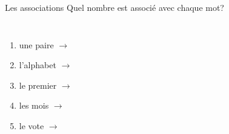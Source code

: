 \begin{frame}{Les associations}
  Quel nombre est associé avec chaque mot? \\
  \begin{columns}
      \begin{enumerate}
        \item une paire $\to$ \underline{}
        \item l'alphabet $\to$ \underline{}
        \item le premier $\to$ \underline{}
        \item les mois $\to$ \underline{}
        \item le vote $\to$ \underline{}
      \end{enumerate}
      \begin{minipage}[c][0.6\textheight]{\linewidth}
        \begin{center}
        \end{center}
      \end{minipage}
  \end{columns}
\end{frame}